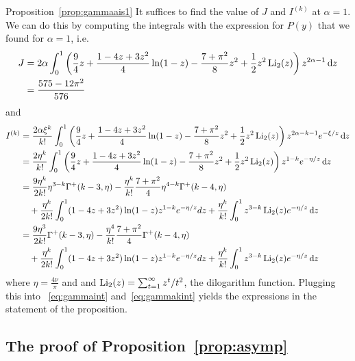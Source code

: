 \begin{proofof}{Proposition~\ref{prop:gammaais1}}
It suffices to find the value of $J$ and $I^{(k)}$ 
at $\alpha = 1$. We can do this by computing the integrals with the expression for $P(y)$ that we found for $\alpha=1$, i.e.
\begin{align*}
	J &= 2\alpha\int_0^1 \left(\frac{9}{4} z + \frac{1 - 4 z + 3 z^2}{4}\ln(1 - z) - \frac{7+\pi^2}{8}
		z^2  + \frac{1}{2}z^2 \operatorname{Li}_2(z)\right) z^{2\alpha -1} \operatorname{\mathrm{d}\hspace{-2pt}} z \\
	&=\frac{575-12\pi^2}{576}
\end{align*}
and 
\begin{align*}
	I^{(k)} &= \frac{2\alpha \xi^k}{k!}\int_0^1 \left(\frac{9}{4} z + \frac{1 - 4 z + 3 z^2}{4}\ln(1 - z) 
		- \frac{7+\pi^2}{8}	z^2  + \frac{1}{2}z^2 \operatorname{Li}_2(z) \right)z^{2\alpha-k-1} e^{-\xi/z} \operatorname{\mathrm{d}\hspace{-2pt}} z \\
	&= \frac{2 \eta^k}{k!}\int_0^1 \left(\frac{9}{4} z + \frac{1 - 4 z + 3 z^2}{4}\ln(1 - z) 
		- \frac{7+\pi^2}{8} z^2  + \frac{1}{2}z^2 \operatorname{Li}_2(z) \right)z^{1-k} e^{-\eta/z} \operatorname{\mathrm{d}\hspace{-2pt}} z \\
	&= \frac{9 \eta^k}{2 k!}\eta^{3-k}\Gamma^+(k-3,\eta)-\frac{\eta^k}{k!}\frac{7+\pi^2}{4}\eta^{4-k}\Gamma^+(k-4,\eta)\\
	&\hspace{10pt}+ \frac{\eta^k}{2k!}\int_0^1 (1-4z+3z^2)\ln(1-z)z^{1-k}e^{-\eta/z}dz+\frac{\eta^k}{k!}\int_0^1 z^{3-k} 
		\operatorname{Li}_2(z) e^{-\eta/z} \operatorname{\mathrm{d}\hspace{-2pt}} z \\
	&=\frac{9 \eta^3}{2 k!}\Gamma^+(k-3,\eta)-\frac{\eta^4}{k!}\frac{7+\pi^2}{4}\Gamma^+(k-4,\eta)\\
	&\hspace{10pt}+ \frac{\eta^k}{2k!}\int_0^1 (1-4z+3z^2)\ln(1-z)z^{1-k}e^{-\eta/z}dz+\frac{\eta^k}{k!}\int_0^1 z^{3-k} 
		\operatorname{Li}_2(z) e^{-\eta/z} \operatorname{\mathrm{d}\hspace{-2pt}} z
\end{align*}
where $\eta = \frac{4\nu}{\pi}$ and and $\operatorname{Li}_2(z) = \sum_{t = 1}^\infty z^t/t^2$, the dilogarithm function. 
Plugging this into ~\eqref{eq:gammaint} and~\eqref{eq:gammakint} yields the expressions in the statement of the proposition.
\end{proofof}


\subsection{The proof of Proposition~\ref{prop:asymp}\label{ssec:asymptotics_local_clustering_P}}

